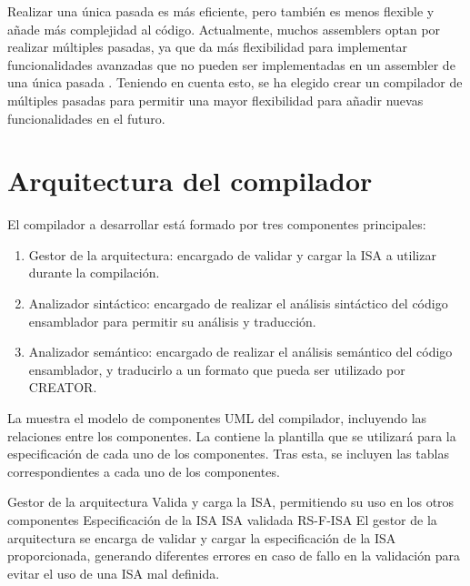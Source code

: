 Realizar una única pasada es más eficiente, pero también es menos flexible y
añade más complejidad al código. Actualmente, muchos \glspl{assembler} optan por
realizar múltiples pasadas, ya que da más flexibilidad para implementar
funcionalidades avanzadas que no pueden ser implementadas en un \gls{assembler}
de una única pasada \parencite{assembler-design}. Teniendo en cuenta esto, se ha
elegido crear un compilador de múltiples pasadas para permitir una mayor
flexibilidad para añadir nuevas funcionalidades en el futuro.

\section{Arquitectura del compilador}\label{sec:architecture}

\noindent
El compilador a desarrollar está formado por tres componentes principales:

\begin{enumerate}
    \item Gestor de la arquitectura: encargado de validar y cargar la \gls{ISA}
    a utilizar durante la compilación.
    \item Analizador sintáctico: encargado de realizar el análisis sintáctico del
    código ensamblador para permitir su análisis y traducción.
    \item Analizador semántico: encargado de realizar el análisis semántico del
    código ensamblador, y traducirlo a un formato que pueda ser utilizado por
    CREATOR.
\end{enumerate}

La  muestra el modelo de componentes UML
\parencite{UMLSpec} del compilador, incluyendo las relaciones entre los
componentes. La  contiene la plantilla que se utilizará para la
especificación de cada uno de los componentes. Tras esta, se incluyen las tablas
correspondientes a cada uno de los componentes.



\begin{component}{Gestor de la arquitectura}
    {Valida y carga la \gls{ISA}, permitiendo su uso en los otros componentes} %
    {} %
    {Especificación de la \gls{ISA}} %
    {\gls{ISA} validada} %
    {RS-F-ISA} %
    El gestor de la arquitectura se encarga de validar y cargar la
    especificación de la \gls{ISA} proporcionada, generando diferentes errores
    en caso de fallo en la validación para evitar el uso de una \gls{ISA} mal
    definida.
\end{component}

